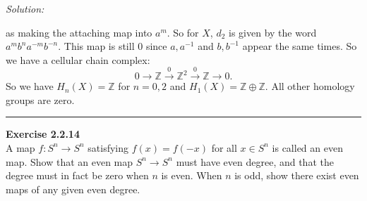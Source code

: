 \documentclass[a4paper, 12pt]{article}
\newenvironment{problem}[2][Exercise]
    { \begin{mdframed}[backgroundcolor=gray!20] \textbf{#1 #2} \\}
    {  \end{mdframed}}
\newenvironment{solution}
    {\textit{Solution:}}
    {}
\begin{document}
\begin{solution}
\begin{enumerate}
as making the attaching map into \(a^m\). So for \(X\), \(d_2\) is given by the word \(a^mb^na^{-m}b^{-n}\). This map is still \(0\) since \(a,a^{-1}\) and \(b,b^{-1}\) appear the same times. So we have a cellular chain complex:
\[0\rightarrow \mathbb{Z}\xrightarrow{0}\mathbb{Z}^2\xrightarrow{0}\mathbb{Z}\rightarrow 0.\]
So we have \(H_n(X)=\mathbb{Z}\) for \(n=0,2\) and \(H_1(X)=\mathbb{Z}\oplus \mathbb{Z}\). All other homology groups are zero.
\end{enumerate}	
\end{solution}

\noindent\rule{7in}{2.8pt}
\begin{problem}{2.2.14}
A map \(f:S^n\rightarrow S^n\) satisfying \(f(x)=f(-x)\) for all \(x\in S^n\) is called an even map. Show that an even map \(S^n\rightarrow S^n\) must have even degree, and that the degree must in fact be zero when \(n\) is even. When \(n\) is odd, 
show there exist even maps of any given even degree.
\end{problem}
\end{document}
